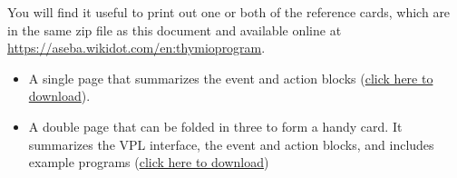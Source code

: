
You will find it useful to print out one or both of the reference cards,
which are in the same zip file as this document and available
online at \url{https://aseba.wikidot.com/en:thymioprogram}.

\begin{itemize}
\item A single page that summarizes the event and action blocks
(\href{https://aseba.wdfiles.com/local--files/en:thymioprogram/thymio-vpl-ref-card-en.pdf}{click here to download}).
\item A double page that can be folded in three to form a handy card.
It summarizes the VPL interface, the event and action blocks,
and includes example programs
(\href{https://aseba.wdfiles.com/local--files/en:thymioprogram/thymio-vpl-folding-ref-card-en.pdf}{click here to download})
\end{itemize}
